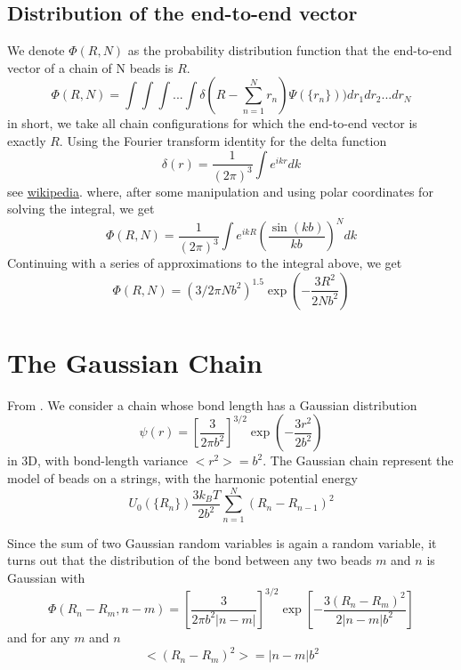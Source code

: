 \documentclass{report}
\begin{document}
\subsection{Distribution of the end-to-end vector}\label{subsection_distributionOfTheEndToEndVector}
We denote $\Phi(R,N)$ as the probability distribution function that the end-to-end vector of a chain of N beads is $R$.
\begin{equation*}
\Phi(R,N) =\int\int\int...\int\delta(R-\sum_{n=1}^Nr_n)\Psi(\{r_n\}))dr_1dr_2...dr_N
\end{equation*}
in short, we take all chain configurations for which the end-to-end vector is exactly $R$. Using the Fourier transform identity for the delta function
\begin{equation*}
\delta(r)= \frac{1}{(2\pi)^3}\int e^{ikr} dk
\end{equation*}
see \href{http://en.wikipedia.org/wiki/Dirac_delta_function}{wikipedia}.
where, after some manipulation and using polar coordinates for solving the integral, we get
\begin{equation*}
\Phi(R,N)=\frac{1}{(2\pi)^3}\int e^{ikR} \left(\frac{\sin(kb)}{kb}\right)^N dk
\end{equation*}
Continuing with a series of approximations to the integral above, we get
\begin{equation*}
\Phi(R,N)=(3/2\pi N b^2)^{1.5} \exp(-\frac{3R^2}{2Nb^2})
\end{equation*}


\section{The Gaussian Chain}\label{section_theGaussianChain}
From \cite{doi1986theory}. We consider a chain whose bond length has a Gaussian distribution 
\begin{equation*}
\psi(r)=\left[\frac{3}{2\pi b^2} \right]^{3/2} \exp \left( -\frac{3r^2}{2b^2} \right)
\end{equation*}
in 3D,  with bond-length variance $<r^2> =b^2$. The Gaussian chain represent the model of beads on a strings, with the harmonic potential energy 
\begin{equation*}
U_0(\{R_n\})\frac{3k_BT}{2b^2}\sum_{n=1}^N (R_n-R_{n-1})^2
\end{equation*}

Since the sum of two Gaussian random variables is again a random variable, it turns out that the distribution of the bond between any two beads $m$ and $n$ is Gaussian with 
\begin{equation*}
\Phi(R_n-R_m,n-m)=\left[\frac{3}{2\pi b^2 |n-m|}\right]^{3/2}\exp \left[-\frac{3(R_n-R_m)^2}{2|n-m|b^2}\right]
\end{equation*}
and for any $m$ and $n$ 
\begin{equation*}
<(R_n-R_m)^2> = |n-m|b^2
\end{equation*}
\end{document}
